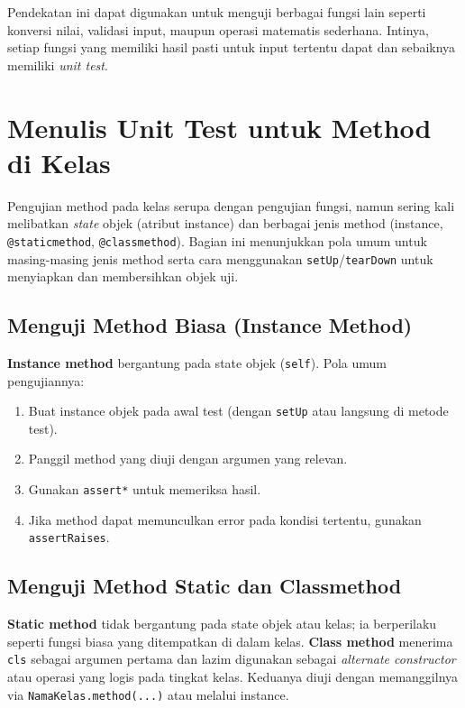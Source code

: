 Pendekatan ini dapat digunakan untuk menguji berbagai fungsi lain seperti konversi nilai, validasi input, maupun operasi matematis sederhana.  
Intinya, setiap fungsi yang memiliki hasil pasti untuk input tertentu dapat dan sebaiknya memiliki \textit{unit test}.

\section{Menulis Unit Test untuk Method di Kelas}

Pengujian method pada kelas serupa dengan pengujian fungsi, namun sering kali melibatkan \emph{state} objek (atribut instance) dan berbagai jenis method (instance, \texttt{@staticmethod}, \texttt{@classmethod}).  
Bagian ini menunjukkan pola umum untuk masing-masing jenis method serta cara menggunakan \texttt{setUp}/\texttt{tearDown} untuk menyiapkan dan membersihkan objek uji.

\subsection{Menguji Method Biasa (Instance Method)}

\textbf{Instance method} bergantung pada state objek (\texttt{self}).  
Pola umum pengujiannya:
\begin{enumerate}
    \item Buat instance objek pada awal test (dengan \texttt{setUp} atau langsung di metode test).
    \item Panggil method yang diuji dengan argumen yang relevan.
    \item Gunakan \texttt{assert*} untuk memeriksa hasil.
    \item Jika method dapat memunculkan error pada kondisi tertentu, gunakan \texttt{assertRaises}.
\end{enumerate}

\subsection{Menguji Method Static dan Classmethod}

\textbf{Static method} tidak bergantung pada state objek atau kelas; ia berperilaku seperti fungsi biasa yang ditempatkan di dalam kelas.  
\textbf{Class method} menerima \texttt{cls} sebagai argumen pertama dan lazim digunakan sebagai \emph{alternate constructor} atau operasi yang logis pada tingkat kelas.  
Keduanya diuji dengan memanggilnya via \texttt{NamaKelas.method(...)} atau melalui instance.

